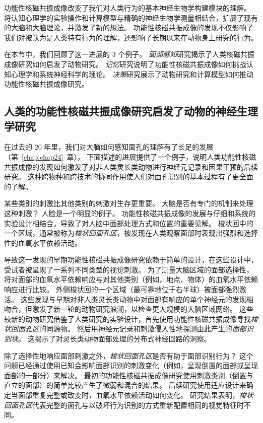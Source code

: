 功能性核磁共振成像改变了我们对人类行为的基本神经生物学构建模块的理解。
将认知心理学的实验操作和计算模型与精确的神经生物学测量相结合，扩展了现有的大脑和大脑理论，并激发了新的想法。
功能性核磁共振成像的发现不仅影响了我们对被认为是人类特有行为的理解，还影响了长期以来在动物身上研究的行为。


在本节中，我们回顾了这一进展的 3 个例子。
\textit{面部感知}研究揭示了人类核磁共振成像研究如何启发了动物研究。
\textit{记忆}研究说明了功能性核磁共振成像如何挑战认知心理学和系统神经科学的理论。
\textit{决策}研究展示了动物研究和计算模型如何推动功能性核磁共振成像研究。


\subsection{人类的功能性核磁共振成像研究启发了动物的神经生理学研究}

在过去的 20 年里，我们对大脑如何感知面孔的理解有了长足的发展（第~\ref{chap:chap24}~章）。 
下面描述的进展提供了一个例子，说明人类功能性核磁共振成像的发现如何激发了对非人类灵长类动物进行神经元记录和因果干预的后续研究。
这种跨物种和跨技术的协同作用使人们对面孔识别的基本过程有了更全面的了解。


某些类别的刺激比其他类别的刺激对生存更重要。 
大脑是否有专门的机制来处理这种刺激？ 
人脸是一个明显的例子。 
功能性核磁共振成像的发展与仔细和系统的实验设计相结合，导致了对人脑中面部处理方式和位置的重要见解。 
梭状回中的一个区域，通常被称为\textit{梭状回面孔区}，被发现在人类观察面部时表现出强烈和选择性的血氧水平依赖活动。


导致这一发现的早期功能性核磁共振成像研究依赖于简单的设计，在这些设计中，受试者被呈现了一系列不同类型的视觉刺激。
为了测量大脑区域的面部选择性，将对面部的血氧水平依赖响应与对其他类别（例如，地点、物体）的血氧水平依赖响应进行比较。 
外侧梭状回的一个区域（最可靠地位于右半球）被面部强烈激活。
这些发现与早期对非人类灵长类动物中对面部有响应的单个神经元的发现相吻合，但激发了新一轮的动物研究浪潮，以检查更大规模的大脑区域网络。
这些较新的动物研究借鉴了人类研究的实验设计，首先使用功能性核磁共振成像寻找\textit{梭状回面孔区}的同源物。
然后用神经元记录和刺激侵入性地探测由此产生的\textit{面部识别块}。
这揭示了对灵长类动物面部处理的分布式神经回路的洞察。


除了选择性地响应面部刺激之外，\textit{梭状回面孔区}是否有助于面部识别行为？ 
这个问题已经通过使用已知会影响面部识别的刺激变化（例如，呈现倒置的面部或呈现面部的一部分）来解决。 
最初的功能性核磁共振成像研究使用刺激类别（倒置与直立的面部）的简单比较产生了微弱和混合的结果。
后续研究使用适应设计来确定当面部重复完整或改变时，血氧水平依赖活动如何变化。
研究结果表明，\textit{梭状回面孔区}代表完整的面孔与以破坏行为识别的方式重新配置相同的视觉特征时不同。


